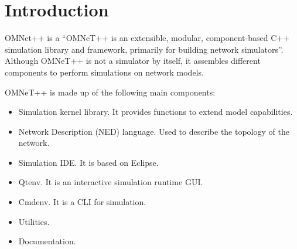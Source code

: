 \chapter{Introduction}\label{sec:introduction}
OMNet++ is a ``OMNeT++ is an extensible, modular, component-based C++ simulation library and framework, primarily for building network simulators''. Although OMNeT++ is not a simulator by itself, it assembles different components to perform simulations on network models.

OMNeT++ is made up of the following main components:

\begin{itemize}
    \item Simulation kernel library. It provides functions to extend model capabilities.
    \item Network Description (NED) language. Used to describe the topology of the network.
    \item Simulation IDE. It is based on Eclipse.
    \item Qtenv. It is an interactive simulation runtime GUI.
    \item Cmdenv. It is a CLI for simulation.
    \item Utilities.
    \item Documentation.
\end{itemize}

